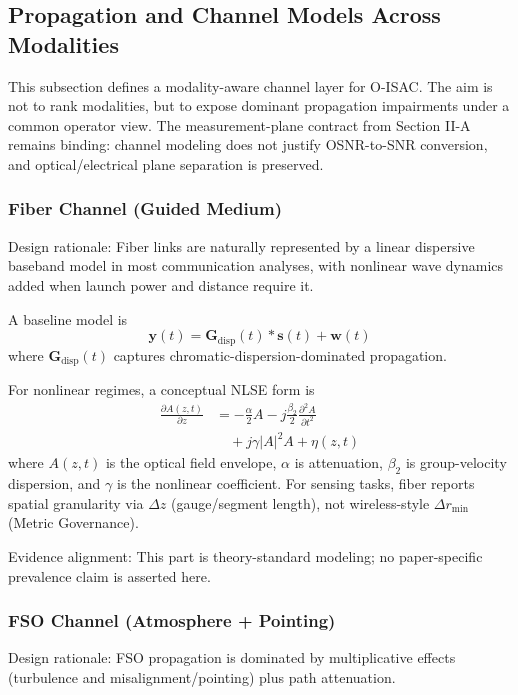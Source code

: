 \documentclass[lettersize,journal]{IEEEtran}
\begin{document}
\subsection{Propagation and Channel Models Across Modalities}
This subsection defines a modality-aware channel layer for O-ISAC. The aim is not to rank modalities, but to expose dominant propagation impairments under a common operator view. The measurement-plane contract from Section II-A remains binding: channel modeling does not justify OSNR-to-SNR conversion, and optical/electrical plane separation is preserved.

\subsubsection{Fiber Channel (Guided Medium)}
Design rationale: Fiber links are naturally represented by a linear dispersive baseband model in most communication analyses, with nonlinear wave dynamics added when launch power and distance require it.

A baseline model is
\begin{equation}
\mathbf{y}(t)=\mathbf{G}_{\mathrm{disp}}(t)\ast \mathbf{s}(t)+\mathbf{w}(t)
\label{eq:fiber_linear_model}
\end{equation}
where $\mathbf{G}_{\mathrm{disp}}(t)$ captures chromatic-dispersion-dominated propagation.

For nonlinear regimes, a conceptual NLSE form is
\begin{equation}
\begin{split}
\frac{\partial A(z,t)}{\partial z}
&=
-\frac{\alpha}{2}A
-j\frac{\beta_2}{2}\frac{\partial^2 A}{\partial t^2} \\
&\quad
+j\gamma |A|^2 A
+\eta(z,t)
\end{split}
\label{eq:nlse_conceptual}
\end{equation}
where $A(z,t)$ is the optical field envelope, $\alpha$ is attenuation, $\beta_2$ is group-velocity dispersion, and $\gamma$ is the nonlinear coefficient. For sensing tasks, fiber reports spatial granularity via $\Delta z$ (gauge/segment length), not wireless-style $\Delta r_{\min}$ (Metric Governance).

Evidence alignment: This part is theory-standard modeling; no paper-specific prevalence claim is asserted here.

\subsubsection{FSO Channel (Atmosphere + Pointing)}
Design rationale: FSO propagation is dominated by multiplicative effects (turbulence and misalignment/pointing) plus path attenuation.
\end{document}
